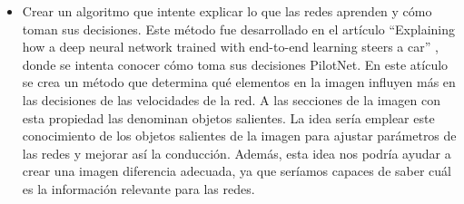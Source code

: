 \begin{itemize}
    \item Crear un algoritmo que intente explicar lo que las redes aprenden y cómo toman sus decisiones. Este método fue desarrollado en el artículo ``Explaining  how  a  deep  neural network trained with end-to-end learning steers a car'' \cite{explaining-end2end} \cite{visual}, donde se intenta conocer cómo toma sus decisiones PilotNet. En este atículo se crea un método que determina qué elementos en la imagen influyen más en las decisiones de las velocidades de la red. A las secciones de la imagen con esta propiedad las denominan objetos salientes. La idea sería emplear este conocimiento de los objetos salientes de la imagen para ajustar parámetros de las redes y mejorar así la conducción. Además, esta idea nos podría ayudar a crear una imagen diferencia adecuada, ya que seríamos capaces de saber cuál es la información relevante para las redes.
\end{itemize}
